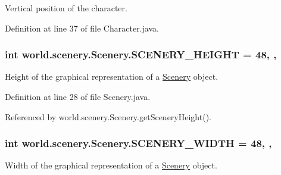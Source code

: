 Vertical position of the character. 



Definition at line 37 of file Character.\-java.

\hypertarget{classworld_1_1scenery_1_1_scenery_a106e53ae6e1647395740237ccce7f363}{
\subsubsection[{S\-C\-E\-N\-E\-R\-Y\-\_\-\-H\-E\-I\-G\-H\-T}]{\setlength{\rightskip}{0pt plus 5cm}int world.\-scenery.\-Scenery.\-S\-C\-E\-N\-E\-R\-Y\-\_\-\-H\-E\-I\-G\-H\-T = 48\hspace{0.3cm}{\ttfamily [static]}, {\ttfamily [protected]}, {\ttfamily [inherited]}}}\label{classworld_1_1scenery_1_1_scenery_a106e53ae6e1647395740237ccce7f363}


Height of the graphical representation of a \hyperlink{classworld_1_1scenery_1_1_scenery}{Scenery} object. 



Definition at line 28 of file Scenery.\-java.



Referenced by world.\-scenery.\-Scenery.\-get\-Scenery\-Height().

\hypertarget{classworld_1_1scenery_1_1_scenery_affb047c028883c6d069a03ef0f1caeb8}{
\subsubsection[{S\-C\-E\-N\-E\-R\-Y\-\_\-\-W\-I\-D\-T\-H}]{\setlength{\rightskip}{0pt plus 5cm}int world.\-scenery.\-Scenery.\-S\-C\-E\-N\-E\-R\-Y\-\_\-\-W\-I\-D\-T\-H = 48\hspace{0.3cm}{\ttfamily [static]}, {\ttfamily [protected]}, {\ttfamily [inherited]}}}\label{classworld_1_1scenery_1_1_scenery_affb047c028883c6d069a03ef0f1caeb8}


Width of the graphical representation of a \hyperlink{classworld_1_1scenery_1_1_scenery}{Scenery} object. 



